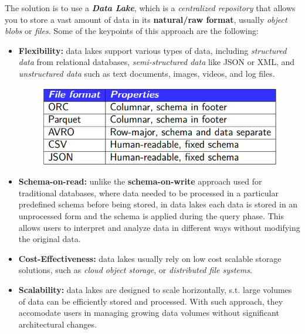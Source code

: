 The solution is to use a \textit{\textbf{Data Lake}}, which is a \textit{centralized repository} that allows you to store a vast amount of data in its \textbf{natural/raw format}, usually \textit{object blobs} or \textit{files}. Some of the keypoints of this approach are the following:
\begin{itemize}
    \item \textbf{Flexibility:} data lakes support various types of data, including \textit{structured data} from relational databases, \textit{semi-structured data} like JSON or XML, and \textit{unstructured data} such as text documents, images, videos, and log files.
    \begin{figure}[ht!]
        \centering
        \includegraphics[scale=0.6]{images/data_lake_file_formats.png}
    \end{figure}
    \item \textbf{Schema-on-read:} unlike the \textbf{schema-on-write} approach used for traditional databases, where data needed to be processed in a particular predefined schema before being stored, in data lakes each data is stored in an unprocessed form and the schema is applied during the query phase. This allows users to interpret and analyze data in different ways without modifying the original data.
    \item \textbf{Cost-Effectiveness:} data lakes usually rely on low cost scalable storage solutions, such as \textit{cloud object storage}, or \textit{distributed file systems}.
    \item \textbf{Scalability:} data lakes are designed to scale horizontally, s.t. large volumes of data can be efficiently stored and processed. With such approach, they accomodate users in managing growing data volumes without significant architectural changes.
\end{itemize}

